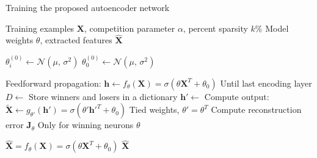%
%
%
%
%

\begin{algorithm}
\caption{Training the proposed autoencoder network}
\label{algo:training}
\begin{algorithmic}[1]

\INPUT Training examples $\mathbf{X}$, competition parameter $\alpha$, percent sparsity $k\%$
\OUTPUT Model weights $\theta$, extracted features $\mathbf{\widehat{X}}$

\item[]
    \State $\theta_{i}^{(0)} \gets \mathcal{N}(\mu,\,\sigma^{2})$
    \State $\theta_{0}^{(0)} \gets \mathcal{N}(\mu,\,\sigma^{2})$
\EndProcedure

\item[]
        \State Feedforward propagation: $\mathbf{h} \gets f_{\theta}(\mathbf{X}) =
        \sigma(\theta\mathbf{X}^{T}+\theta_{0})$
        \Comment Until last encoding layer
        \State $D \gets$ 
        \Comment Store winners and losers in a dictionary
        \State $\mathbf{h'} \gets$ 
        \State Compute output: $\mathbf{\widetilde{X}} \gets 
        g_{\theta'}(\mathbf{h'}) = \sigma(\theta'\mathbf{h'}^{T}+\theta_{0})$
        \Comment Tied weights, $\theta'=\theta^{T}$
        \State Compute reconstruction error $\mathbf{J}_{\theta}$
        \State {}
        \Comment Only for winning neurons
    \EndFor
    \State \Return $\theta$ 
\EndProcedure

\item[]
    \State
    $\mathbf{\widehat{X}}=f_{\theta}(\mathbf{X})=\sigma(\theta\mathbf{X}^{T} +
    \theta_{0})$
    \State \Return $\mathbf{\widehat{X}}$
\EndProcedure

\end{algorithmic}
\end{algorithm}
